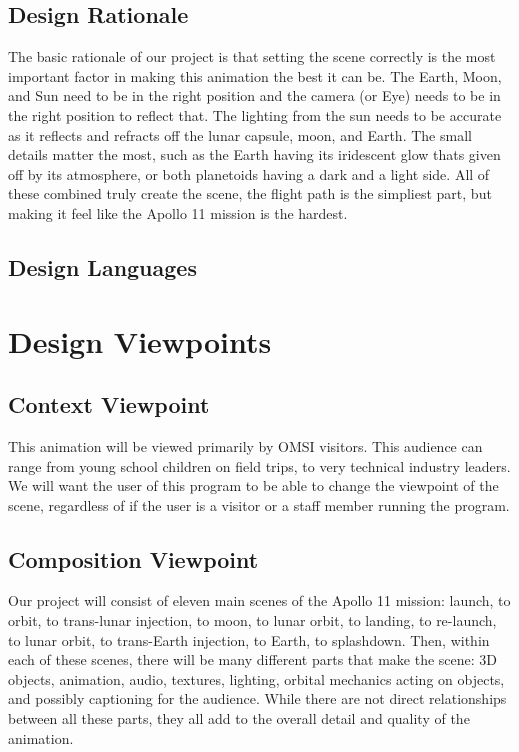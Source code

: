 \documentclass[onecolumn, draftclsnofoot,10pt, compsoc]{IEEEtran}
\begin{document}
    \subsection{Design Rationale}
	The basic rationale of our project is that setting the scene correctly is the most important factor in making this animation the best it can be. The Earth, Moon, and Sun need to be in the right position and the camera (or Eye) needs to be in the right position to reflect that. The lighting from the sun needs to be accurate as it reflects and refracts off the lunar capsule, moon, and Earth. The small details matter the most, such as the Earth having its iridescent glow thats given off by its atmosphere, or both planetoids having a dark and a light side. All of these combined truly create the scene, the flight path is the simpliest part, but making it feel like the Apollo 11 mission is the hardest.
    \subsection{Design Languages}



\section{Design Viewpoints}

    \subsection{Context Viewpoint}
    
    This animation will be viewed primarily by OMSI visitors. This audience can range from young school children on field trips, to very technical industry leaders. We will want the user of this program to be able to change the viewpoint of the scene, regardless of if the user is a visitor or a staff member running the program.  
    
    \subsection{Composition Viewpoint}
    
    Our project will consist of eleven main scenes of the Apollo 11 mission: launch, to orbit, to trans-lunar injection, to moon, to lunar orbit, to landing, to re-launch, to lunar orbit, to trans-Earth injection, to Earth, to splashdown. Then, within each of these scenes, there will be many different parts that make the scene: 3D objects, animation, audio, textures, lighting, orbital mechanics acting on objects, and possibly captioning for the audience. While there are not direct relationships between all these parts, they all add to the overall detail and quality of the animation. 
    
\end{document}
